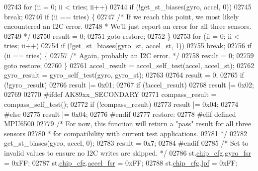 \begin{DoxyCode}
02743     \textcolor{keywordflow}{for} (ii = 0; ii < tries; ii++)
02744         \textcolor{keywordflow}{if} (!get\_st\_biases(gyro, accel, 0))
02745             \textcolor{keywordflow}{break};
02746     \textcolor{keywordflow}{if} (ii == tries) \{
02747         \textcolor{comment}{/* If we reach this point, we most likely encountered an I2C error.}
02748 \textcolor{comment}{         * We'll just report an error for all three sensors.}
02749 \textcolor{comment}{         */}
02750         result = 0;
02751         \textcolor{keywordflow}{goto} restore;
02752     \}
02753     \textcolor{keywordflow}{for} (ii = 0; ii < tries; ii++)
02754         \textcolor{keywordflow}{if} (!get\_st\_biases(gyro\_st, accel\_st, 1))
02755             \textcolor{keywordflow}{break};
02756     \textcolor{keywordflow}{if} (ii == tries) \{
02757         \textcolor{comment}{/* Again, probably an I2C error. */}
02758         result = 0;
02759         \textcolor{keywordflow}{goto} restore;
02760     \}
02761     accel\_result = accel\_self\_test(accel, accel\_st);
02762     gyro\_result = gyro\_self\_test(gyro, gyro\_st);
02763 
02764     result = 0;
02765     \textcolor{keywordflow}{if} (!gyro\_result)
02766         result |= 0x01;
02767     \textcolor{keywordflow}{if} (!accel\_result)
02768         result |= 0x02;
02769 
02770 \textcolor{preprocessor}{#ifdef AK89xx\_SECONDARY}
02771     compass\_result = compass\_self\_test();
02772     \textcolor{keywordflow}{if} (!compass\_result)
02773         result |= 0x04;
02774 \textcolor{preprocessor}{#else}
02775         result |= 0x04;
02776 \textcolor{preprocessor}{#endif}
02777 restore:
02778 \textcolor{preprocessor}{#elif defined MPU6500}
02779     \textcolor{comment}{/* For now, this function will return a "pass" result for all three sensors}
02780 \textcolor{comment}{     * for compatibility with current test applications.}
02781 \textcolor{comment}{     */}
02782     get\_st\_biases(gyro, accel, 0);
02783     result = 0x7;
02784 \textcolor{preprocessor}{#endif}
02785     \textcolor{comment}{/* Set to invalid values to ensure no I2C writes are skipped. */}
02786     st.\hyperlink{structgyro__state__s_ac895217592e2084bd520b0be8e9d20ee}{chip\_cfg}.\hyperlink{structchip__cfg__s_abae9129fae33706b5f73b2b1867fcc89}{gyro\_fsr} = 0xFF;
02787     st.\hyperlink{structgyro__state__s_ac895217592e2084bd520b0be8e9d20ee}{chip\_cfg}.\hyperlink{structchip__cfg__s_a97d5de8aa2fab5cc81ca2180130fc6ac}{accel\_fsr} = 0xFF;
02788     st.\hyperlink{structgyro__state__s_ac895217592e2084bd520b0be8e9d20ee}{chip\_cfg}.\hyperlink{structchip__cfg__s_a0a4067140c6a3704b4312ba62b77aadb}{lpf} = 0xFF;

\end{DoxyCode}
